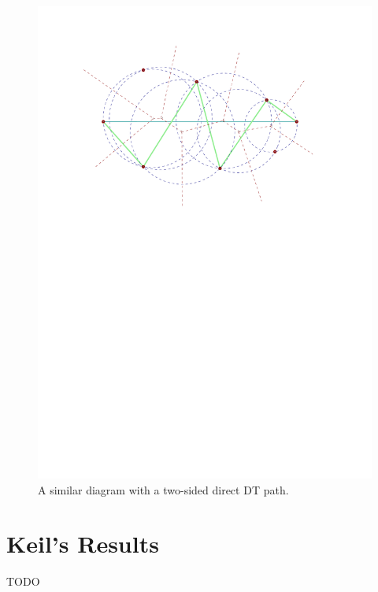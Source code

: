 \documentclass{tufte-handout}
\begin{document}
\begin{figure}
  \includegraphics[scale=1.0]{figures/two-sided_path.pdf}
  \caption{A similar diagram with a two-sided direct DT path.}
\end{figure}

\part{Keil's Results}

TODO


\newpage

\end{document}

